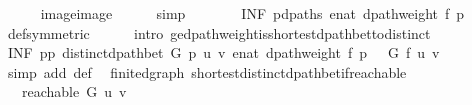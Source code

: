 \begin{isabellebody}
\ \ \ \ \isamarkupfalse%
\ image{\isacharunderscore}{\kern0pt}image\isanewline
\ \ \ \ \isamarkupfalse%
\ simp\isanewline
\ \ \isamarkupfalse%
\ \isamarkupfalse%
\ {\isachardoublequoteopen}{\isachardot}{\kern0pt}{\isachardot}{\kern0pt}{\isachardot}{\kern0pt}\ {\isasymle}\ {\isacharparenleft}{\kern0pt}INF\ p{\isasymin}{\isacharquery}{\kern0pt}dpaths{\isachardot}{\kern0pt}\ enat\ {\isacharparenleft}{\kern0pt}dpath{\isacharunderscore}{\kern0pt}weight\ f\ p{\isacharparenright}{\kern0pt}{\isacharparenright}{\kern0pt}{\isachardoublequoteclose}\ \isanewline
\ \ \ \ \isamarkupfalse%
\ {\isasymdelta}{\isacharunderscore}{\kern0pt}def{\isacharbrackleft}{\kern0pt}symmetric{\isacharbrackright}{\kern0pt}\isanewline
\ \ \ \ \isamarkupfalse%
\ {\isacharparenleft}{\kern0pt}intro\ {\isasymdelta}{\isacharunderscore}{\kern0pt}ge{\isacharunderscore}{\kern0pt}dpath{\isacharunderscore}{\kern0pt}weight{\isacharunderscore}{\kern0pt}is{\isacharunderscore}{\kern0pt}shortest{\isacharunderscore}{\kern0pt}dpath{\isacharunderscore}{\kern0pt}bet{\isacharunderscore}{\kern0pt}to{\isacharunderscore}{\kern0pt}distinct{\isacharparenright}{\kern0pt}\isanewline
\ \ \isamarkupfalse%
\ \isamarkupfalse%
\ {\isachardoublequoteopen}{\isacharparenleft}{\kern0pt}INF\ p{\isasymin}{\isacharbraceleft}{\kern0pt}p{\isachardot}{\kern0pt}\ distinct{\isacharunderscore}{\kern0pt}dpath{\isacharunderscore}{\kern0pt}bet\ G\ p\ u\ v{\isacharbraceright}{\kern0pt}{\isachardot}{\kern0pt}\ enat\ {\isacharparenleft}{\kern0pt}dpath{\isacharunderscore}{\kern0pt}weight\ f\ p{\isacharparenright}{\kern0pt}{\isacharparenright}{\kern0pt}\ {\isasymle}\ {\isasymdelta}\ G\ f\ u\ v{\isachardoublequoteclose}\isanewline
\ \ \ \ \isamarkupfalse%
\ {\isacharparenleft}{\kern0pt}simp\ add{\isacharcolon}{\kern0pt}\ {\isasymdelta}{\isacharunderscore}{\kern0pt}def{\isacharparenright}{\kern0pt}\isanewline
{}\isamarkupfalse%
%
\endisatagproof
{\isafoldproof}%
%
\isadelimproof
\isanewline
%
\endisadelimproof
%
\isadeliminvisible
\isanewline
%
\endisadeliminvisible
%
\isataginvisible
{}\isamarkupfalse%
\ {\isacharparenleft}{\kern0pt}\ finite{\isacharunderscore}{\kern0pt}dgraph{\isacharparenright}{\kern0pt}\ shortest{\isacharunderscore}{\kern0pt}distinct{\isacharunderscore}{\kern0pt}dpath{\isacharunderscore}{\kern0pt}bet{\isacharunderscore}{\kern0pt}if{\isacharunderscore}{\kern0pt}reachable{\isacharcolon}{\kern0pt}\isanewline
\ \ \ {\isachardoublequoteopen}reachable\ G\ u\ v{\isachardoublequoteclose}\isanewline

\end{isabellebody}
